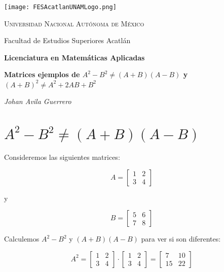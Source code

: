 \documentclass[a4paper,12pt]{article}
\begin{document}
\begin{titlepage}
    \centering
    \texttt{[image: FESAcatlanUNAMLogo.png]} %
    \vspace{1cm}
    
    {\scshape\large Universidad Nacional Autónoma de México \par}
    {\large Facultad de Estudios Superiores Acatlán \par}
    \vspace{1.5cm}
    
    {\Large\bfseries Licenciatura en Matemáticas Aplicadas \par}
    \vspace{2cm}
    
    {\Huge\bfseries  Matrices ejemplos de \(A^2 - B^2 \neq (A+B)(A-B)  \) y \( (A+B)^2\neq A^2+2AB+B^2  \) 

    \par}
    \vspace{2cm}
    
    {\Large\itshape Johan Avila Guerrero \par}
    \vfill
    
    
    \vfill
    
\end{titlepage}



\section{\(A^2 - B^2 \neq (A+B)(A-B)  \)}
Consideremos las siguientes matrices:

\[ A = \begin{bmatrix} 1 & 2 \\ 3 & 4 \end{bmatrix} \]

y 

\[ B = \begin{bmatrix} 5 & 6 \\ 7 & 8 \end{bmatrix} \]

Calculemos \(A^2 - B^2\) y \((A+B)(A-B)\) para ver si son diferentes:

\[ A^2 = \begin{bmatrix} 1 & 2 \\ 3 & 4 \end{bmatrix} \cdot \begin{bmatrix} 1 & 2 \\ 3 & 4 \end{bmatrix} = \begin{bmatrix} 7 & 10 \\ 15 & 22 \end{bmatrix} \]
\end{document}
